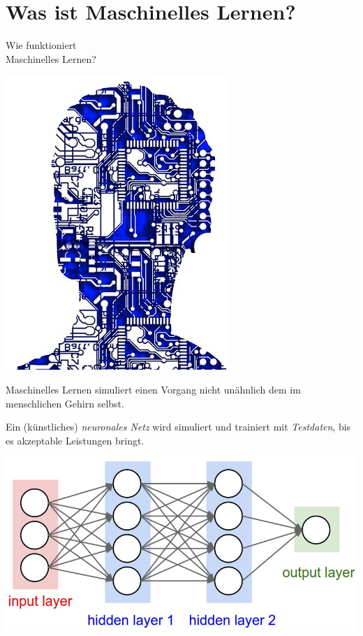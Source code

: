 \documentclass[aspectratio=43,x11names]{beamer}
\begin{document}

\section{Was ist Maschinelles Lernen?}

\begin{frame}
\begin{center}
\huge
Wie funktioniert\\Maschinelles Lernen?
\end{center}
\end{frame}

\begin{frame}
\begin{multicols}{2}
\includegraphics[scale=0.4]{images/artificial-intelligence-507813_640.jpg} 
\columnbreak

Maschinelles Lernen simuliert einen Vorgang nicht unähnlich dem im menschlichen Gehirn selbst.
\pause\bigskip

Ein (künstliches) \emph{neuronales Netz} wird simuliert und trainiert mit \emph{Testdaten}, bis es akzeptable Leistungen bringt.
\end{multicols}
\end{frame}

\begin{frame}
\begin{center}
\includegraphics[scale=0.375]{images/simple_neural_network_header.jpg} 
\end{center}
\end{frame}
\end{document}

